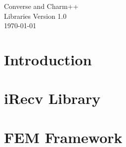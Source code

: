 \documentclass[11pt]{article}
\newcommand{\charmpp}{{\sc Charm++}}
\begin{document}
\begin{titlepage}
\vspace*{2in}
\Huge
\begin{center}
Converse and \charmpp \\
Libraries
\vspace*{0.5in}
Version 1.0\\
\vspace*{0.7in}
\today
\end{center}
\normalsize
\end{titlepage}

\newpage
\tableofcontents

\newpage
\section{Introduction}


\newpage
\section{iRecv Library}


\newpage
\section{FEM Framework}


\nocite{InterOpIPPS96}  %

\newpage
{}



\newpage
{}

\end{document}

